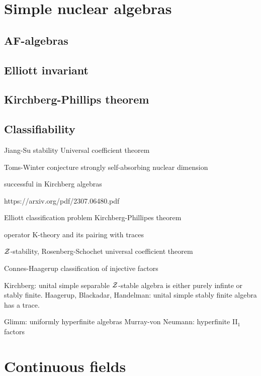\documentclass{../../large}
\begin{document}
\chapter{Simple nuclear algebras}
\section{AF-algebras}

\section{Elliott invariant}

\section{Kirchberg-Phillips theorem}

\section{Classifiability}
Jiang-Su stability
Universal coefficient theorem

Toms-Winter conjecture
strongly self-absorbing
nuclear dimension




successful in Kirchberg algebras


https://arxiv.org/pdf/2307.06480.pdf

Elliott classification problem
Kirchberg-Phillipes theorem

operator K-theory and its pairing with traces

$\mathcal{Z}$-stability, Rosenberg-Schochet universal coefficient theorem

Connes-Haagerup classification of injective factors

Kirchberg: unital simple separable $\mathcal{Z}$-stable algebra is either purely infinte or stably finite.
Haagerup, Blackadar, Handelman: unital simple stably finite algebra has a trace.

Glimm: uniformly hyperfinite algebras
Murray-von Neumann: hyperfinite II$_1$ factors














\chapter{Continuous fields}
\end{document}
